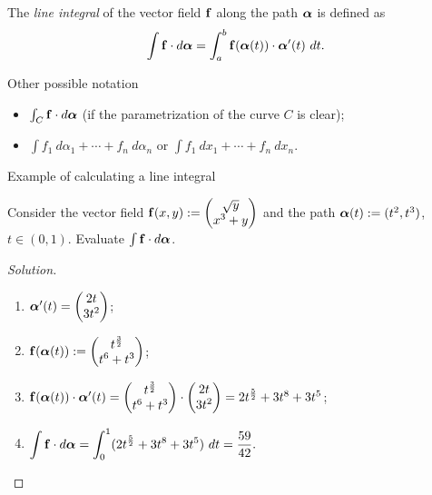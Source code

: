 \begin{definition}%
    \label{def:line-integral}
    The \emph{line integral} of the vector field \(\mathbf{f}\) along the path \(\boldsymbol{\alpha}\) is defined as
    \[
        \int \mathbf{f} \cdot d\boldsymbol{\alpha} = \int_{a}^{b} \mathbf{f}(\boldsymbol{\alpha}(t)) \cdot \boldsymbol{\alpha}'(t) \ dt.
    \]
\end{definition}

Other possible notation
\begin{itemize}
    \item  \(\int_C \mathbf{f} \cdot d\boldsymbol{\alpha}  \) (if the parametrization of the curve \(C\) is clear);
    \item \(\int f_1 \ d\alpha_1 + \cdots + f_n \ d\alpha_n\) or \(\int f_1 \ dx_1 + \cdots + f_n \ dx_n\).
\end{itemize}





{Example of calculating a line integral}


\begin{example}
    Consider the vector field \(\mathbf{f}(x,y) := \begin{pmatrix}
        \sqrt y \\ x^3 + y
    \end{pmatrix}\)
    and the path
    \(\boldsymbol{\alpha}(t):= (t^2,t^3)\), \(t \in (0,1)\).
    Evaluate \(\int \mathbf{f} \cdot d\boldsymbol{\alpha}\).
\end{example}
\begin{proof}[Solution]
    \begin{enumerate}
        \item \(\boldsymbol{\alpha}'(t) = \begin{pmatrix}
                  2t \\ 3t^2
              \end{pmatrix}\);
        \item \(\mathbf{f}(\boldsymbol{\alpha}(t)) := \begin{pmatrix}
                  t^{\frac{3}{2}} \\ t^6 + t^3
              \end{pmatrix}\);
        \item \( \mathbf{f}(\boldsymbol{\alpha}(t)) \cdot  \boldsymbol{\alpha}'(t) = \begin{pmatrix}
                  t^{\frac{3}{2}} \\ t^6 + t^3
              \end{pmatrix} \cdot  \begin{pmatrix}
                  2t \\ 3t^2
              \end{pmatrix} = 2 t^{\frac{5}{2}} + 3t^8 + 3t^5\);
        \item
              \(
              \displaystyle\int \mathbf{f} \cdot d\boldsymbol{\alpha} = \displaystyle\int_{0}^{1} (2 t^{\frac{5}{2}} + 3t^8 + 3t^5 ) \ dt = \frac{59}{42}.
              \) \qedhere
    \end{enumerate}
\end{proof}


